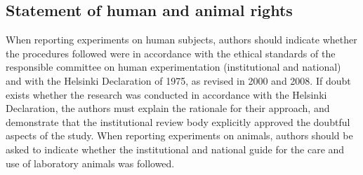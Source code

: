 \subsection{Statement of human and animal rights}
When reporting experiments on human subjects, authors should indicate whether the procedures followed were in accordance with the ethical standards of the responsible committee on human experimentation (institutional and national) and with the Helsinki Declaration of 1975, as revised in 2000 and 2008. If doubt exists whether the research was conducted in accordance with the Helsinki Declaration, the authors must explain the rationale for their approach, and demonstrate that the institutional review body explicitly approved the doubtful aspects of the study. When reporting experiments on animals, authors should be asked to indicate whether the institutional and national guide for the care and use of laboratory animals was followed.
